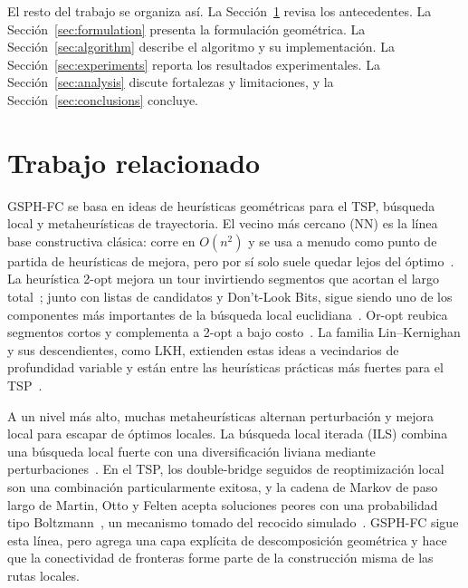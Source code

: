 \documentclass[runningheads]{llncs}
\begin{document}
El resto del trabajo se organiza así. La Sección~\ref{sec:related}
revisa los antecedentes. La Sección~\ref{sec:formulation} presenta la
formulación geométrica. La Sección~\ref{sec:algorithm} describe el
algoritmo y su implementación. La Sección~\ref{sec:experiments} reporta
los resultados experimentales. La Sección~\ref{sec:analysis} discute
fortalezas y limitaciones, y la Sección~\ref{sec:conclusions} concluye.

\section{Trabajo relacionado}
\label{sec:related}

GSPH-FC se basa en ideas de heurísticas geométricas para el TSP,
búsqueda local y metaheurísticas de trayectoria. El vecino más cercano
(NN) es la línea base constructiva clásica: corre en $O(n^2)$ y se usa a
menudo como punto de partida de heurísticas de mejora, pero por sí solo
suele quedar lejos del óptimo~\cite{kizilatecs2013nearest}. La
heurística 2-opt mejora un tour invirtiendo segmentos que acortan el
largo total~\cite{croes1958method}; junto con listas de candidatos y
Don't-Look Bits, sigue siendo uno de los componentes más importantes de
la búsqueda local euclidiana~\cite{johnson1997tsp,bentley1992fast}.
Or-opt reubica segmentos cortos y complementa a 2-opt a bajo
costo~\cite{or1976traveling}. La familia Lin--Kernighan y sus
descendientes, como LKH, extienden estas ideas a vecindarios de
profundidad variable y están entre las heurísticas prácticas más
fuertes para el
TSP~\cite{lin1973effective,helsgaun2000effective,helsgaun2017extension}.

A un nivel más alto, muchas metaheurísticas alternan perturbación y
mejora local para escapar de óptimos locales. La búsqueda local iterada
(ILS) combina una búsqueda local fuerte con una diversificación liviana
mediante perturbaciones~\cite{lourencco2003ils}. En el TSP, los
double-bridge seguidos de reoptimización local son una combinación
particularmente exitosa, y la cadena de Markov de paso largo de Martin,
Otto y Felten acepta soluciones peores con una probabilidad tipo
Boltzmann~\cite{martin1991large}, un mecanismo tomado del recocido
simulado~\cite{kirkpatrick1983optimization}. GSPH-FC sigue esta línea,
pero agrega una capa explícita de descomposición geométrica y hace que
la conectividad de fronteras forme parte de la construcción misma de las
rutas locales.
\end{document}
